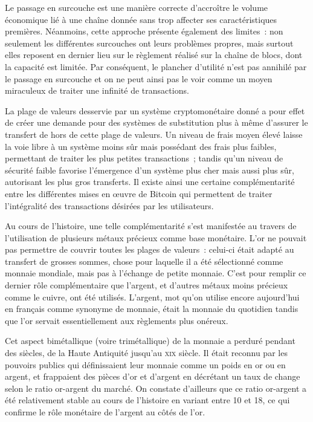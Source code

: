 Le passage en surcouche est une manière correcte d'accroître le volume économique lié à une chaîne donnée sans trop affecter ses caractéristiques premières. Néanmoins, cette approche présente également des limites~: non seulement les différentes surcouches ont leurs problèmes propres, mais surtout elles reposent en dernier lieu sur le règlement réalisé sur la chaîne de blocs, dont la capacité est limitée. Par conséquent, le plancher d'utilité n'est pas annihilé par le passage en surcouche et on ne peut ainsi pas le voir comme un moyen miraculeux de traiter une infinité de transactions.

La plage de valeurs desservie par un système cryptomonétaire donné a pour effet de créer une demande pour des systèmes de substitution plus à même d'assurer le transfert de hors de cette plage de valeurs. Un niveau de frais moyen élevé laisse la voie libre à un système moins sûr mais possédant des frais plus faibles, permettant de traiter les plus petites transactions~; tandis qu'un niveau de sécurité faible favorise l'émergence d'un système plus cher mais aussi plus sûr, autorisant les plus gros transferts. Il existe ainsi une certaine complémentarité entre les différentes mises en œuvre de Bitcoin qui permettent de traiter l'intégralité des transactions désirées par les utilisateurs.

Au cours de l'histoire, une telle complémentarité s'est manifestée au travers de l'utilisation de plusieurs métaux précieux comme base monétaire. L'or ne pouvait pas permettre de couvrir toutes les plages de valeurs~: celui-ci était adapté au transfert de grosses sommes, chose pour laquelle il a été sélectionné comme monnaie mondiale, mais pas à l'échange de petite monnaie. C'est pour remplir ce dernier rôle complémentaire que l'argent, et d'autres métaux moins précieux comme le cuivre, ont été utilisés. L'argent, mot qu'on utilise encore aujourd'hui en français comme synonyme de monnaie, était la monnaie du quotidien tandis que l'or servait essentiellement aux règlements plus onéreux.

Cet aspect bimétallique (voire trimétallique) de la monnaie a perduré pendant des siècles, de la Haute Antiquité jusqu'au \textsc{xix}\ieme{} siècle. Il était reconnu par les pouvoirs publics qui définissaient leur monnaie comme un poids en or ou en argent, et frappaient des pièces d'or et d'argent en décrétant un taux de change selon le ratio or-argent du marché. On constate d'ailleurs que ce ratio or-argent a été relativement stable au cours de l'histoire en variant entre 10 et 18, ce qui confirme le rôle monétaire de l'argent au côtés de l'or.


